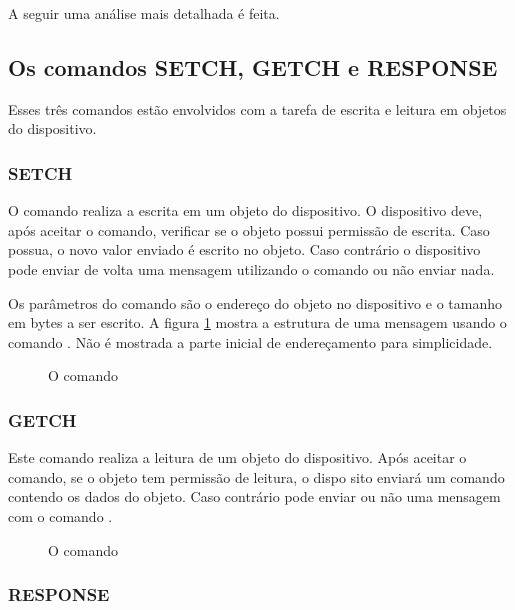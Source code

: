 \documentclass[11pt]{report}
\begin{document}
A seguir uma análise mais detalhada é feita.

\subsection{Os comandos SETCH, GETCH e RESPONSE}

Esses três comandos estão envolvidos com a tarefa de escrita e leitura em objetos do dispositivo.

\subsubsection{SETCH}

O comando  realiza a escrita em um objeto do dispositivo. O dispositivo deve, após aceitar o comando, verificar se o objeto possui permissão de escrita. Caso possua, o novo valor enviado é escrito no objeto. Caso contrário o dispositivo pode enviar de volta uma mensagem utilizando o comando  ou não enviar nada.

Os parâmetros do comando  são o endereço do objeto no dispositivo e o tamanho em bytes a ser escrito. A figura \ref{fig:setch} mostra a estrutura de uma mensagem usando o comando . Não é mostrada a parte inicial de endereçamento para simplicidade.

\begin{figure}[H]
\centering

\caption{O comando }
\label{fig:setch}
\end{figure}

\subsubsection{GETCH}

Este comando realiza a leitura de um objeto do dispositivo. Após aceitar o comando, se o objeto tem permissão de leitura, o dispo sito enviará um comando  contendo os dados do objeto. Caso contrário pode enviar ou não uma mensagem com o comando .

\begin{figure}[H]
\centering

\caption{O comando }
\end{figure}

\subsubsection{RESPONSE}
\end{document}
